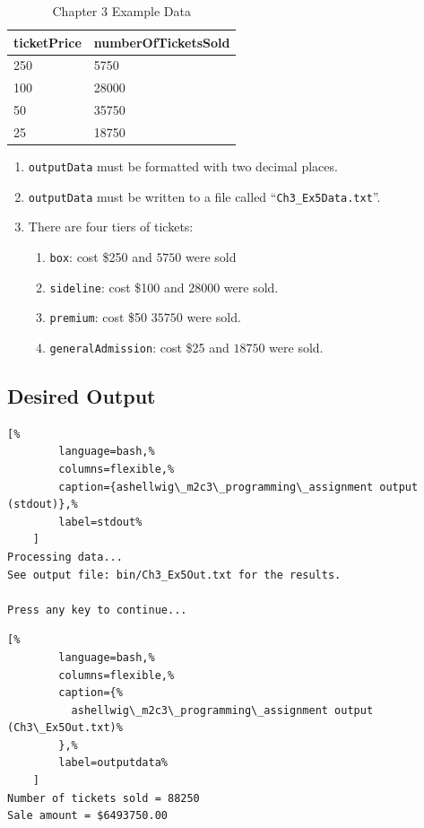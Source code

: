 \documentclass[a4paper, 11pt]{article}
\begin{document}
      \begin{table}[h!]
        \begin{tabular}{ ||l|l|| }
          \hline
          ticketPrice &numberOfTicketsSold \\
          \hline\hline
          250 &5750 \\
          100 &28000 \\
          50  &35750 \\
          25  &18750 \\
          \hline
        \end{tabular}
        \centering
        \caption{Chapter 3 Example Data}
        \label{pa:data}
      \end{table}

      \begin{enumerate}
        \item \texttt{outputData} must be formatted with two decimal places.
        \item \texttt{outputData} must be written to a file called
          ``\texttt{Ch3\_Ex5Data.txt}''.
        \item There are four tiers of tickets:
          \begin{enumerate}
            \item \texttt{box}: cost \$250 and $5750$ were sold
            \item \texttt{sideline}: cost \$100 and $28000$ were sold.
            \item \texttt{premium}: cost \$50 $35750$ were sold.
            \item \texttt{generalAdmission}: cost \$25 and $18750$ were sold.
          \end{enumerate}
      \end{enumerate}

    \subsection{Desired Output}
      \begin{lstlisting}[%
        language=bash,%
        columns=flexible,%
        caption={ashellwig\_m2c3\_programming\_assignment output (stdout)},%
        label=stdout%
    ]
Processing data...
See output file: bin/Ch3_Ex5Out.txt for the results.

Press any key to continue...
      \end{lstlisting}

      \begin{lstlisting}[%
        language=bash,%
        columns=flexible,%
        caption={%
          ashellwig\_m2c3\_programming\_assignment output (Ch3\_Ex5Out.txt)%
        },%
        label=outputdata%
    ]
Number of tickets sold = 88250
Sale amount = $6493750.00
      \end{lstlisting}
\end{document}
